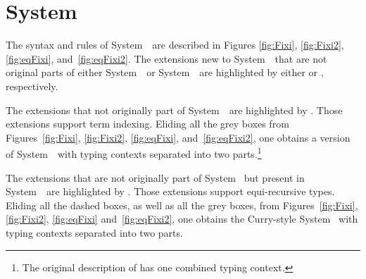 \section{System \Fixi} \label{sec:fixi:def}
The syntax and rules of System~\Fi\ are described in
Figures \ref{fig:Fixi}, \ref{fig:Fixi2}, \ref{fig:eqFixi}, and~\ref{fig:eqFixi2}.
The extensions new to System~\Fixi\ that are not original parts of
either System~\Fw\ or System~\Fixw\ are highlighted by either
 or , respectively.

The extensions that not originally part of System~\Fixw\ are highlighted
by . Those extensions support term indexing.
Eliding all the grey boxes from Figures~\ref{fig:Fixi}, \ref{fig:Fixi2}, \ref{fig:eqFixi},
and~\ref{fig:eqFixi2}, one obtains a version of System~\Fixw\ with
typing contexts separated into two parts.\footnote{
	The original description of \Fixw \cite{AbeMat04} has
	one combined typing context.}

The extensions that are not originally part of System \Fw\ but
present in System~\Fixw\ are highlighted by .
Those extensions support equi-recursive types. Eliding all the dashed boxes,
as well as all the grey boxes, from Figures~\ref{fig:Fixi}, \ref{fig:Fixi2}, \ref{fig:eqFixi}
and~\ref{fig:eqFixi2}, one obtains the Curry-style System \Fw\ with
typing contexts separated into two parts.


